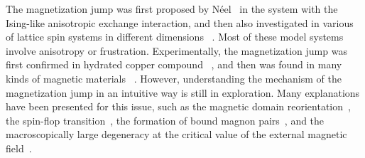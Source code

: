 \documentclass[article,10pt,onecolumn,superscriptaddress,floatfix]{revtex4}
\begin{document}
The magnetization jump was first proposed by N\'eel~\cite{ap_neel} in the system with the Ising-like anisotropic exchange interaction, and then also investigated in various of lattice spin systems in different dimensions ~\cite{Kohno1997,Sakai1999,Aligia2000,Schulenburg2002,Dmitriev2006,Kalinov2006,Heidrich-Meisner2009,Kolezhuk2012,Albarracin2014,Kishine2014,Hiroki2015,Morita2016}. Most of these model systems involve anisotropy or frustration. Experimentally, the magnetization jump was first confirmed in hydrated copper compound ~\cite{Poulis1951}, and then was found in many kinds of magnetic materials ~\cite{Moller1977,Hardy2003,Ghivelder2004,Yoshii2007,Diop2016,Manago2016,Maji2010}. However, understanding the mechanism of the magnetization jump in an intuitive way is still in exploration. Many explanations have been presented for this issue, such as the magnetic domain reorientation~\cite{Moller1977,Hardy2003,Maji2010}, the spin-flop transition~\cite{Gerhardt1998, Sakai1999,Hiroki2015}, the formation of bound magnon pairs~\cite{Dmitriev2006}, and the macroscopically large degeneracy at the critical value of the external magnetic field~\cite{Schulenburg2002,Richter2004}.
\end{document}
